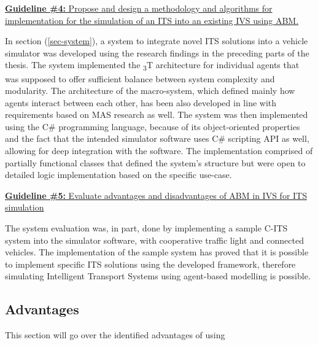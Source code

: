 \documentclass[main.tex]{subfiles}
\begin{document}
\ul{\textbf{Guideline \#4:} Propose and design a methodology and algorithms for implementation for the 
simulation of an ITS into an existing IVS using ABM.}

In section (\ref{sec-system}), a system to integrate novel ITS solutions into a vehicle simulator was developed using the research findings in the 
preceding parts of the thesis. The system implemented the \textsubscript{3}T architecture for individual agents that was supposed 
to offer sufficient balance between system complexity and modularity. The architecture of the macro-system, which defined mainly 
how agents interact between each other, has been also developed in line with requirements based on MAS research as well. The 
system was then implemented using the C\# programming language, because of its object-oriented properties and the fact that 
the intended simulator software uses C\# scripting API as well, allowing for deep integration with the software. The implementation comprised of partially functional classes that 
defined the system's structure but were open to detailed logic implementation based on the specific use-case. 

\ul{\textbf{Guideline \#5:} Evaluate advantages and disadvantages of ABM in IVS for ITS simulation}

The system evaluation was, in part, done by implementing a sample C-ITS system into the simulator software, with cooperative 
traffic light and connected vehicles. The implementation of the sample system has proved that it is possible to implement specific 
ITS solutions using the developed framework, therefore simulating Intelligent Transport Systems using agent-based modelling is 
possible.

\subsection{Advantages}

This section will go over the identified advantages of using 
\end{document}
